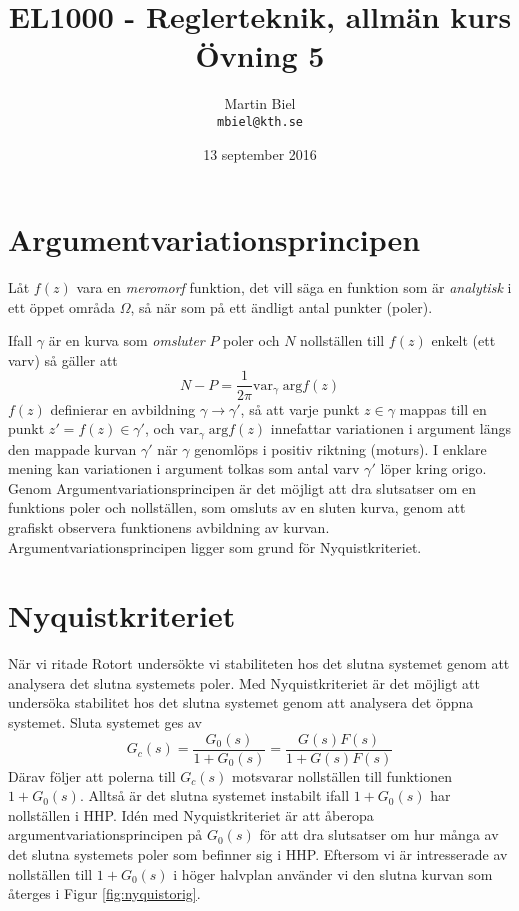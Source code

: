 \documentclass[12pt]{article}
\begin{document}
\begin{titlepage}
\author{Martin Biel \\ \texttt{mbiel@kth.se}}
\title{EL1000 - Reglerteknik, allmän kurs \\ \Large Övning 5}
\date{13 september 2016}
\end{titlepage}

\maketitle

\section*{Argumentvariationsprincipen}
Låt $f(z)$ vara en \emph{meromorf} funktion, det vill säga en funktion som är \emph{analytisk} i ett öppet områda $\Omega$, så när som på ett ändligt antal punkter (poler).

Ifall $\gamma$ är en kurva som \emph{omsluter} $P$ poler och $N$ nollställen till $f(z)$ enkelt (ett varv) så gäller att
\begin{equation*}
 N-P = \frac{1}{2\pi}\mathrm{var}_{\gamma}\;\mathrm{arg}f(z)
\end{equation*}
$f(z)$ definierar en avbildning $\gamma \rightarrow \gamma'$, så att varje punkt $z \in \gamma$ mappas till en punkt $z' = f(z) \in \gamma'$, och $\mathrm{var}_{\gamma}\;\mathrm{arg}f(z)$ innefattar variationen i argument längs den mappade kurvan $\gamma'$ när $\gamma$ genomlöps i positiv riktning (moturs). I enklare mening kan variationen i argument tolkas som antal varv $\gamma'$ löper kring origo. Genom Argumentvariationsprincipen är det möjligt att dra slutsatser om en funktions poler och nollställen, som omsluts av en sluten kurva, genom att grafiskt observera funktionens avbildning av kurvan. Argumentvariationsprincipen ligger som grund för Nyquistkriteriet.

\section*{Nyquistkriteriet}
När vi ritade Rotort undersökte vi stabiliteten hos det slutna systemet genom att analysera det slutna systemets poler. Med Nyquistkriteriet är det möjligt att undersöka stabilitet hos det slutna systemet genom att analysera det öppna systemet. Sluta systemet ges av
\begin{equation*}
  G_c(s) = \frac{G_0(s)}{1 + G_0(s)} = \frac{G(s)F(s)}{1 + G(s)F(s)}
\end{equation*}
Därav följer att polerna till $G_c(s)$ motsvarar nollställen till funktionen $1 + G_0(s)$. Alltså är det slutna systemet instabilt ifall $1 + G_0(s)$ har nollställen i HHP. Idén med Nyquistkriteriet är att åberopa argumentvariationsprincipen på $G_0(s)$ för att dra slutsatser om hur många av det slutna systemets poler som befinner sig i HHP. Eftersom vi är intresserade av nollställen till $1+G_0(s)$ i höger halvplan använder vi den slutna kurvan som återges i Figur \ref{fig:nyquistorig}.
\end{document}
